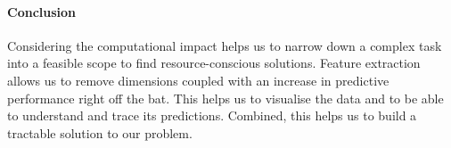 

\paragraph{Conclusion}

Considering the computational impact helps us to narrow down a complex task into a feasible scope to find resource-conscious solutions.
Feature extraction allows us to remove dimensions coupled with an increase in predictive performance right off the bat.
This helps us to visualise the data and to be able to understand and trace its predictions.
Combined, this helps us to build a tractable solution to our problem.
